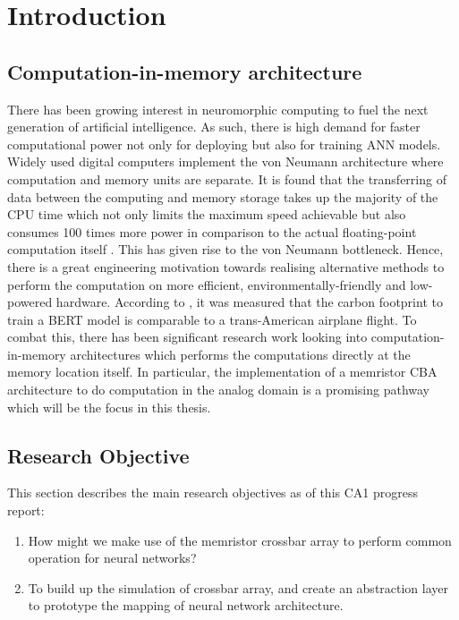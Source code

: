 
\chapter{Introduction}
\vspace{2em}

\section{Computation-in-memory architecture}

There has been growing interest in neuromorphic computing to fuel the next generation of artificial intelligence. As such, there is high demand for faster computational power not only for deploying but also for training \ac{ANN} models. Widely used digital computers implement the von Neumann architecture where computation and memory units are separate. It is found that the transferring of data between the computing and memory storage takes up the majority of the \acs{CPU} time which not only limits the maximum speed achievable but also consumes 100 times more power in comparison to the actual floating-point computation itself \cite{Zou_Xu_Chen_Yan_Han_2021}. This has given rise to the von Neumann bottleneck. Hence, there is a great engineering motivation towards realising alternative methods to perform the computation on more efficient, environmentally-friendly and low-powered hardware. According to \citet{Strubell_Ganesh_McCallum_2019} \cite{Strubell_Ganesh_McCallum_2019}, it was measured that the carbon footprint to train a \acs{BERT} model is comparable to a trans-American airplane flight. To combat this, there has been significant research work looking into computation-in-memory architectures which performs the computations directly at the memory location itself. In particular, the implementation of a memristor \ac{CBA} architecture to do computation in the analog domain is a promising pathway which will be the focus in this thesis.

\newpage

\section{Research Objective}

This section describes the main research objectives as of this CA1 progress report:

\begin{enumerate}
  \item How might we make use of the memristor crossbar array to perform common operation for neural networks?
  \item To build up the simulation of crossbar array, and create an abstraction layer to prototype the mapping of neural network architecture.
\end{enumerate}

